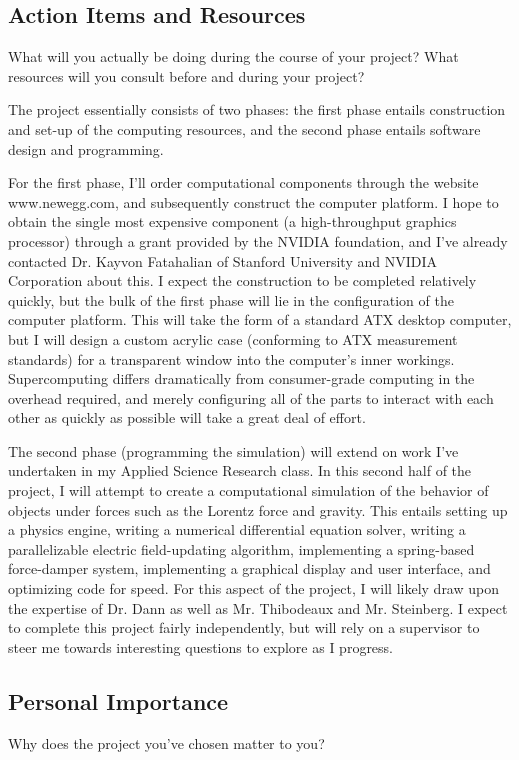 \documentclass[10pt]{article}
\begin{document}
\subsection{Action Items and Resources}
What will you actually be doing during the course of your project? What resources will you consult before and during your project?

The project essentially consists of two phases: the first phase entails construction and set-up of the computing resources, and the second phase entails software design and programming.

For the first phase, I'll order computational components through the website www.newegg.com, and subsequently construct the computer platform. I hope to obtain the single most expensive component (a high-throughput graphics processor) through a grant provided by the NVIDIA foundation, and I've already contacted Dr. Kayvon Fatahalian of Stanford University and NVIDIA Corporation about this. I expect the construction to be completed relatively quickly, but the bulk of the first phase will lie in the configuration of the computer platform. This will take the form of a standard ATX desktop computer, but I will design a custom acrylic case (conforming to ATX measurement standards) for a transparent window into the computer's inner workings. Supercomputing differs dramatically from consumer-grade computing in the overhead required, and merely configuring all of the parts to interact with each other as quickly as possible will take a great deal of effort. 

The second phase (programming the simulation) will extend on work I've undertaken in my Applied Science Research class. In this second half of the project, I will attempt to create a computational simulation of the behavior of objects under forces such as the Lorentz force and gravity. This entails setting up a physics engine, writing a numerical differential equation solver, writing a parallelizable electric field-updating algorithm, implementing a spring-based force-damper system, implementing a graphical display and user interface, and optimizing code for speed. For this aspect of the project, I will likely draw upon the expertise of Dr. Dann as well as Mr. Thibodeaux and Mr. Steinberg. I expect to complete this project fairly independently, but will rely on a supervisor to steer me towards interesting questions to explore as I progress.


\subsection{Personal Importance}
Why does the project you've chosen matter to you?
\end{document}
